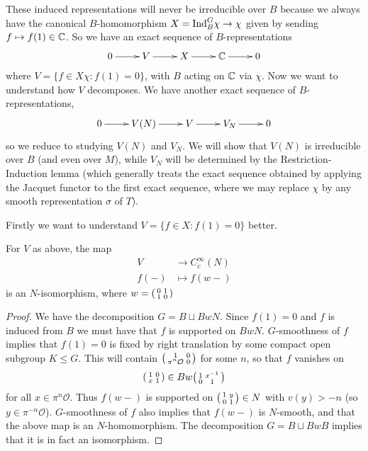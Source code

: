 These induced representations will never be irreducible over $B$ because we always have the canonical $B$-homomorphism $X=\mathrm{Ind}_B^G \chi \to \chi$ given by sending $f \mapsto f(1) \in \mathbb{C}$. So we have an exact sequence of $B$-representations
$$\xymatrix{0 \ar[r] & V \ar[r] & X \ar[r] & \CC \ar[r] & 0}$$
where $V=\{f \in X \chi : f(1)=0\}$, with $B$ acting on $\mathbb{C}$ via $\chi$. Now we want to understand how $V$ decomposes. We have another exact sequence of $B$-representations,
$$\xymatrix{0 \ar[r] & V(N) \ar[r] & V \ar[r] & V_N \ar[r] & 0}$$
so we reduce to studying $V(N)$ and $V_N$. We will show that $V(N)$ is irreducible over $B$ (and even over $M$), while $V_N$ will be determined by the Restriction-Induction lemma (which generally treats the exact sequence obtained by applying the Jacquet functor to the first exact sequence, where we may replace $\chi$ by any smooth representation $\sigma$ of $T$).

Firstly we want to understand $V=\{f \in X:f(1)=0\}$ better.

\begin{lemma}\label{reduce to N}
    For $V$ as above, the map 
    \begin{equation*}
        \begin{split}
            V &\to C_c^\infty(N) \\
            f(-) &\mapsto f(w-) 
        \end{split}
    \end{equation*}
    is an $N$-isomorphism, where $w=\begin{psmallmatrix}
        0&1\\1&0
    \end{psmallmatrix}$
\end{lemma}
\begin{proof}
    We have the decomposition $G=B \sqcup BwN$. Since $f(1)=0$ and $f$ is induced from $B$ we must have that $f$ is supported on $BwN$. $G$-smoothness of $f$ implies that $f(1)=0$ is fixed by right translation by some compact open subgroup $K\leq G$. This will contain $\begin{psmallmatrix}
        1&0\\\pi^n \mathcal O &0
    \end{psmallmatrix}$ for some $n$, so that $f$ vanishes on 
    $$\begin{psmallmatrix}
        1&0\\x&1
    \end{psmallmatrix} \in Bw \begin{psmallmatrix}
        1&x^{-1}\\0&1
    \end{psmallmatrix}$$
    for all $x \in \pi^n \mathcal O$. Thus $f(w-)$ is supported on $\begin{psmallmatrix}
        1&y\\0&1
    \end{psmallmatrix} \in N$ with $v(y) > -n$ (so $y \in \pi^{-n}\mathcal O$). $G$-smoothness of $f$ also implies that $f(w-)$ is $N$-smooth, and that the above map is an $N$-homomorphism. The decomposition $G=B \sqcup BwB$ implies that it is in fact an isomorphism.
\end{proof}

